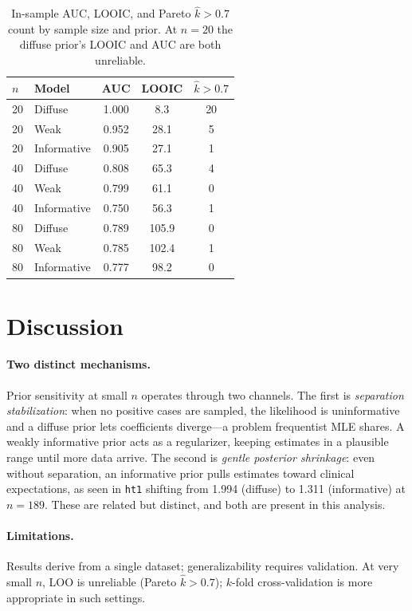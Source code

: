 \documentclass[11pt]{article}
\begin{document}
\begin{table}[H]
\centering
\begin{tabular}{llccc}
\toprule
$n$ & Model & AUC & LOOIC & $\hat{k}>0.7$ \\
\midrule
20 & Diffuse     & 1.000 &  8.3 & 20 \\
20 & Weak        & 0.952 & 28.1 &  5 \\
20 & Informative & 0.905 & 27.1 &  1 \\
\midrule
40 & Diffuse     & 0.808 & 65.3 &  4 \\
40 & Weak        & 0.799 & 61.1 &  0 \\
40 & Informative & 0.750 & 56.3 &  1 \\
\midrule
80 & Diffuse     & 0.789 & 105.9 & 0 \\
80 & Weak        & 0.785 & 102.4 & 1 \\
80 & Informative & 0.777 &  98.2 & 0 \\
\bottomrule
\end{tabular}
\caption{In-sample AUC, LOOIC, and Pareto $\hat{k}>0.7$ count by
sample size and prior. At $n=20$ the diffuse prior's LOOIC and AUC
are both unreliable.}
\label{tab:loo_sub}
\end{table}

\section{Discussion}

\paragraph{Two distinct mechanisms.}
Prior sensitivity at small $n$ operates through two channels.
The first is \emph{separation stabilization}: when no positive cases
are sampled, the likelihood is uninformative and a diffuse prior lets
coefficients diverge---a problem frequentist MLE shares.
A weakly informative prior acts as a regularizer, keeping estimates
in a plausible range until more data arrive.
The second is \emph{gentle posterior shrinkage}: even without
separation, an informative prior pulls estimates toward clinical
expectations, as seen in \texttt{ht1} shifting from 1.994 (diffuse)
to 1.311 (informative) at $n = 189$. These are related but distinct,
and both are present in this analysis.

\paragraph{Limitations.}
Results derive from a single dataset; generalizability requires
validation. At very small $n$, LOO is unreliable
(Pareto $\hat{k} > 0.7$); $k$-fold cross-validation is more
appropriate in such settings.
\end{document}
